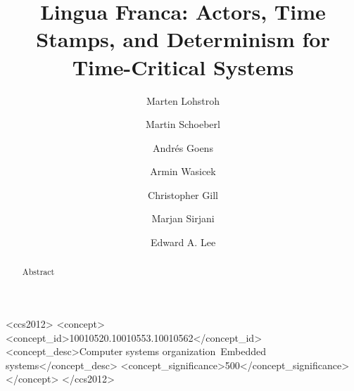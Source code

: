 \documentclass[sigconf]{acmart}
\begin{document}
\title{Lingua Franca: Actors, Time Stamps, and Determinism for Time-Critical Systems}


\author{Marten Lohstroh}


\author{Martin Schoeberl}

\author{Andr\'es Goens}
\orcid{}

\author{Armin Wasicek}
\orcid{}

\author{Christopher Gill}
\orcid{}


\author{Marjan Sirjani}
\orcid{}


\author{Edward A. Lee}



\renewcommand{\shortauthors}{E. A. Lee et al.}

\begin{abstract}
Abstract
\end{abstract}

%
%
\begin{CCSXML}
	<ccs2012>
	<concept>
	<concept_id>10010520.10010553.10010562</concept_id>
	<concept_desc>Computer systems organization~Embedded systems</concept_desc>
	<concept_significance>500</concept_significance>
	</concept>
	</ccs2012>  
\end{CCSXML}
\end{document}
